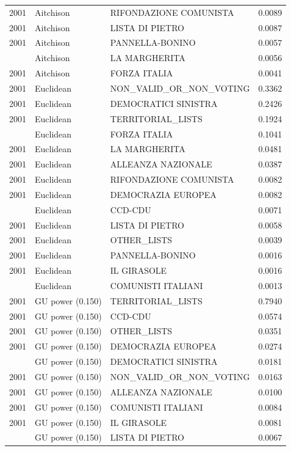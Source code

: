 \begin{longtable}[t]{rllr}
2001 & Aitchison & RIFONDAZIONE COMUNISTA & 0.0089\\
2001 & Aitchison & LISTA DI PIETRO & 0.0087\\
2001 & Aitchison & PANNELLA-BONINO & 0.0057\\
\addlinespace
2001 & Aitchison & LA MARGHERITA & 0.0056\\
2001 & Aitchison & FORZA ITALIA & 0.0041\\
2001 & Euclidean & NON\_VALID\_OR\_NON\_VOTING & 0.3362\\
2001 & Euclidean & DEMOCRATICI SINISTRA & 0.2426\\
2001 & Euclidean & TERRITORIAL\_LISTS & 0.1924\\
\addlinespace
2001 & Euclidean & FORZA ITALIA & 0.1041\\
2001 & Euclidean & LA MARGHERITA & 0.0481\\
2001 & Euclidean & ALLEANZA NAZIONALE & 0.0387\\
2001 & Euclidean & RIFONDAZIONE COMUNISTA & 0.0082\\
2001 & Euclidean & DEMOCRAZIA EUROPEA & 0.0082\\
\addlinespace
2001 & Euclidean & CCD-CDU & 0.0071\\
2001 & Euclidean & LISTA DI PIETRO & 0.0058\\
2001 & Euclidean & OTHER\_LISTS & 0.0039\\
2001 & Euclidean & PANNELLA-BONINO & 0.0016\\
2001 & Euclidean & IL GIRASOLE & 0.0016\\
\addlinespace
2001 & Euclidean & COMUNISTI ITALIANI & 0.0013\\
2001 & GU power (0.150) & TERRITORIAL\_LISTS & 0.7940\\
2001 & GU power (0.150) & CCD-CDU & 0.0574\\
2001 & GU power (0.150) & OTHER\_LISTS & 0.0351\\
2001 & GU power (0.150) & DEMOCRAZIA EUROPEA & 0.0274\\
\addlinespace
2001 & GU power (0.150) & DEMOCRATICI SINISTRA & 0.0181\\
2001 & GU power (0.150) & NON\_VALID\_OR\_NON\_VOTING & 0.0163\\
2001 & GU power (0.150) & ALLEANZA NAZIONALE & 0.0100\\
2001 & GU power (0.150) & COMUNISTI ITALIANI & 0.0084\\
2001 & GU power (0.150) & IL GIRASOLE & 0.0081\\
\addlinespace
2001 & GU power (0.150) & LISTA DI PIETRO & 0.0067\\

\end{longtable}
